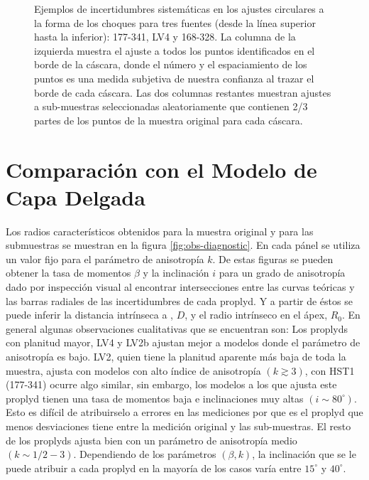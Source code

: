 \begin{figure}
\begin{tabular}{@{}c@{}c@{}c@{}}
\end{tabular}
\caption{Ejemplos de incertidumbres sistemáticas en los ajustes circulares a la forma de los choques para tres fuentes (desde la línea superior hasta la inferior): 177-341, LV4 y 168-328. La columna de la izquierda muestra el ajuste a todos los puntos identificados en el borde de la cáscara, donde el número y el espaciamiento de los puntos es una medida subjetiva de nuestra confianza al trazar el borde de cada cáscara. Las dos columnas restantes muestran ajustes a sub-muestras seleccionadas aleatoriamente que contienen 2/3 partes de los puntos de la muestra original para cada cáscara.}
\label{fig:char-radii-obs}
\end{figure}

\section{Comparación con el Modelo de Capa Delgada}

Los radios característicos obtenidos para la muestra original y para las submuestras se muestran en la figura \ref{fig:obs-diagnostic}. En cada pánel se utiliza un valor fijo para el parámetro de anisotropía $k$. De estas figuras se pueden obtener la tasa de momentos $\beta$ y la inclinación $i$ para un grado de anisotropía dado por inspección visual al encontrar intersecciones entre las curvas teóricas y las barras radiales de las incertidumbres de cada proplyd. Y a partir de éstos se puede inferir la distancia intrínseca a \thC{}, $D$, y el radio intrínseco en el ápex, $R_0$. En general algunas observaciones cualitativas que se encuentran son: Los proplyds con planitud mayor, LV4 y LV2b ajustan mejor a modelos donde el parámetro de anisotropía es bajo. LV2, quien tiene la planitud aparente más baja de toda la muestra, ajusta con modelos con alto índice de anisotropía $(k \gtrsim 3)$, con HST1 (177-341) ocurre algo similar, sin embargo, los modelos a los que ajusta este proplyd tienen una tasa de momentos baja e inclinaciones muy altas $(i \sim 80^{\circ})$. Esto es difícil de atribuirselo a errores en las mediciones por que es el proplyd que menos desviaciones tiene entre la medición original y las sub-muestras. El resto de los proplyds ajusta bien con un parámetro de anisotropía medio $(k\sim 1/2 - 3)$. Dependiendo de los parámetros $(\beta, k)$, la inclinación que se le puede atribuir a cada proplyd en la mayoría de los casos varía entre $15^\circ$ y $40^\circ$. 

